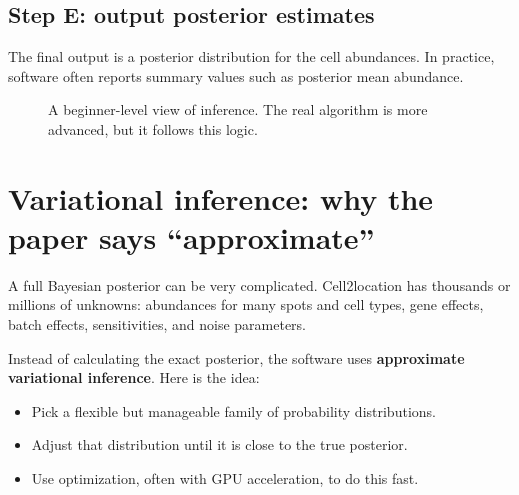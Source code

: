 \documentclass[11pt]{article}
\newcommand{\term}[1]{\textbf{#1}}
\begin{document}
\subsection{Step E: output posterior estimates}

The final output is a posterior distribution for the cell abundances. In practice, software often reports summary values such as posterior mean abundance.

\begin{figure}[H]
\centering
{}
\caption{A beginner-level view of inference. The real algorithm is more advanced, but it follows this logic.}
\end{figure}

\section{Variational inference: why the paper says ``approximate''}

A full Bayesian posterior can be very complicated. Cell2location has thousands or millions of unknowns: abundances for many spots and cell types, gene effects, batch effects, sensitivities, and noise parameters.

Instead of calculating the exact posterior, the software uses \term{approximate variational inference}. Here is the idea:

\begin{itemize}
  \item Pick a flexible but manageable family of probability distributions.
  \item Adjust that distribution until it is close to the true posterior.
  \item Use optimization, often with GPU acceleration, to do this fast.
\end{itemize}
\end{document}
